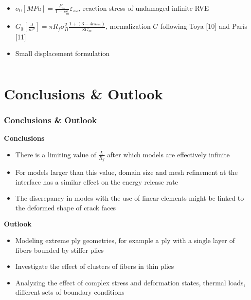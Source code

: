 \documentclass[first,firstsupp,lastsupp,last,hyperref,table]{ETHclass}
\begin{document}
\begin{frame}
\begin{columns}
\begin{column}{0.4\textwidth}
\begin{itemize}[label=]
\item $\sigma_{0}\left[MPa\right]=\frac{E_{m}}{1-\nu_{m}^{2}}\varepsilon_{xx}$, reaction stress of undamaged infinite RVE\\[5pt]
\item $G_{0}\left[\frac{J}{m^{2}}\right]=\pi R_{f}\sigma_{R}^{2}\frac{1+\left(3-4 nu_{m}\right)}{8 G_{m}}$, normalization $G$ following Toya [10] and Par\'is [11]\\[5pt]
\item Small displacement formulation
\end{itemize}
\end{column}
\end{columns}
\end{frame}



\section[Conclusions]{Conclusions \& Outlook}

\begin{frame}
\frametitle{\vspace*{0.5cm}\small Conclusions \& Outlook}
\vspace{-0.75cm}
\centering
\scriptsize
\begin{alertblock}{\footnotesize \bf{Conclusions}}
\begin{itemize}[label=]
  \item There is a limiting value of $\frac{L}{R_{f}}$ after which models are effectively infinite
	\item For models larger than this value, domain size and mesh refinement at the interface has a similar effect on the energy release rate
  \item The discrepancy in modes with the use of linear elements might be linked to the deformed shape of crack faces
\end{itemize}
\end{alertblock}
\begin{alertblock}{\footnotesize \bf{Outlook}}
\begin{itemize}[label=]
	\item Modeling extreme ply geometries, for example a ply with a single layer of fibers bounded by stiffer plies\\[9pt]
	\item Investigate the effect of clusters of fibers in thin plies\\[9pt]
	\item Analyzing the effect of complex stress and deformation states, thermal loads, different sets of boundary conditions
\end{itemize}
\end{alertblock}
\end{frame}
\end{document}
